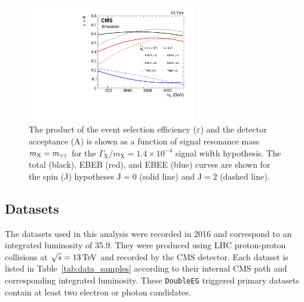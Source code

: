 \begin{figure}[!htb]
    \centering
    \includegraphics[width=0.65\textwidth]{figures/eff_x_acc_k001.pdf}
    \caption{The product of the event selection efficiency ($\varepsilon$) and the detector acceptance (A) is shown as a function of signal resonance mass $m_{\mathrm{X}} = m_{\gamma\gamma}$ for the $\Gamma_{\mathrm{X}}/m_{\mathrm{X}}=1.4\times10^{-4}$ signal width hypothesis. The total (black), EBEB (red), and EBEE (blue) curves are shown for the spin (J) hypotheses $\mathrm{J}=0$ (solid line) and $\mathrm{J}=2$ (dashed line).
    }
    \label{fig:eff_x_acc}
\end{figure}


\subsection{Datasets}

The datasets used in this analysis were recorded in 2016 and correspond to an integrated luminosity of 35.9\fbinv. They were produced using LHC proton-proton collisions at $\sqrt{s} = 13\,\text{Te\hspace{-.08em}V}$ and recorded by the CMS detector. Each dataset is listed in Table~\ref{tab:data_samples} according to their internal CMS path and corresponding integrated luminosity. These \texttt{DoubleEG} triggered primary datasets contain at least two electron or photon candidates.


